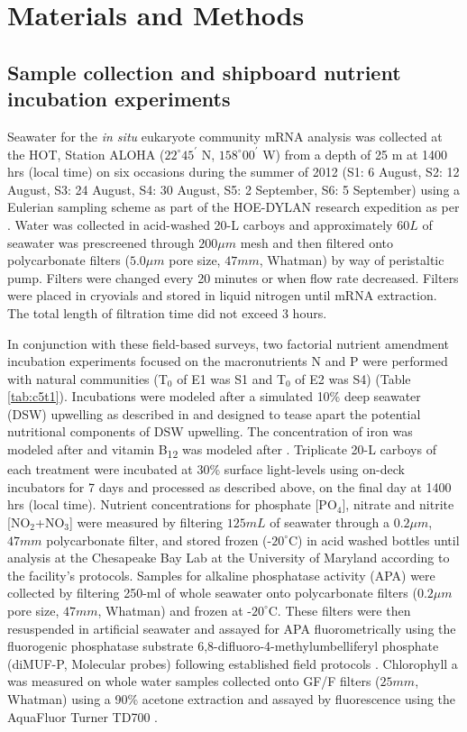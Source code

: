 \section{Materials and Methods}

\subsection{Sample collection and shipboard nutrient incubation experiments}
Seawater for the \textit{in situ} eukaryote community mRNA analysis was collected at the HOT, Station ALOHA ($22^\circ 45^\prime$ N, $158^\circ 00^\prime$ W) from a depth of 25 m at 1400 hrs (local time) on six occasions during the summer of 2012 (S1: 6 August, S2: 12 August, S3: 24 August, S4: 30 August, S5: 2 September, S6: 5 September) using a Eulerian sampling scheme as part of the HOE-DYLAN research expedition as per \citet{Alexander2015a}. Water was collected in acid-washed 20-L carboys and approximately $60 L$ of seawater was prescreened through $200 \mu m$ mesh and then filtered onto polycarbonate filters ($5.0 \mu m$ pore size, $47 mm$, Whatman) by way of peristaltic pump. Filters were changed every 20 minutes or when flow rate decreased. Filters were placed in cryovials and stored in liquid nitrogen until mRNA extraction. The total length of filtration time did not exceed 3 hours. \par

In conjunction with these field-based surveys, two factorial nutrient amendment incubation experiments focused on the macronutrients N and P were performed with natural communities (T$_0$ of E1 was S1 and T$_0$ of E2 was S4) (Table \ref{tab:c5t1}). Incubations were modeled after a simulated 10\% deep seawater (DSW) upwelling as described in \citet{Alexander2015a} and designed to tease apart the potential nutritional components of DSW upwelling. The concentration of iron was modeled after \citet{Marchetti2012a} and vitamin B\textsubscript{12} was modeled after \citet{Bertrand2007}. Triplicate 20-L carboys of each treatment were incubated at 30\% surface light-levels using on-deck incubators for 7 days and processed as described above, on the final day at 1400 hrs (local time). Nutrient concentrations for phosphate [PO$_{4}$], nitrate and nitrite [NO$_2$+NO$_3$] were measured by filtering $125 mL$ of seawater through a $0.2 \mu m$, $47 mm$ polycarbonate filter, and stored frozen (-$20^\circ$C) in acid washed bottles until analysis at the Chesapeake Bay Lab at the University of Maryland according to the facility's protocols. Samples for alkaline phosphatase activity (APA) were collected by filtering 250-ml of whole seawater onto polycarbonate filters ($0.2 \mu m$ pore size, $47 mm$, Whatman) and frozen at -$20^\circ$C. These filters were then resuspended in artificial seawater and assayed for APA fluorometrically using the fluorogenic phosphatase substrate 6,8-difluoro-4-methylumbelliferyl phosphate (diMUF-P, Molecular probes) following established field protocols \citep{Dyhrman2006}. Chlorophyll a was measured on whole water samples collected onto GF/F filters ($25 mm$, Whatman) using a 90\% acetone extraction and assayed by fluorescence using the AquaFluor Turner TD700 \citep{Parsons1984}.\par

